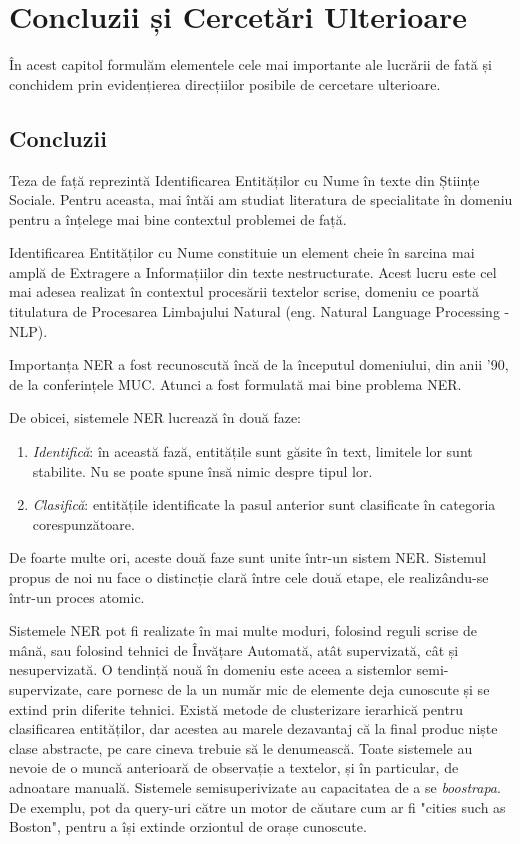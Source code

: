 \chapter{Concluzii și Cercetări Ulterioare}
\label{chapter:conclusions}

În acest capitol formulăm elementele cele mai importante ale lucrării de fată și conchidem prin evidențierea direcțiilor posibile de cercetare ulterioare.

\section{Concluzii}

Teza de față reprezintă Identificarea Entităților cu Nume în texte din Științe Sociale. Pentru aceasta, mai întăi am studiat literatura de specialitate în domeniu pentru a înțelege mai bine contextul problemei de față.


Identificarea Entităților cu Nume constituie un element cheie în sarcina mai amplă de Extragere a Informațiilor din texte nestructurate. Acest lucru este cel mai adesea realizat în contextul procesării textelor scrise, domeniu ce poartă titulatura de Procesarea Limbajului Natural (eng. Natural Language Processing - NLP).

Importanța NER a fost recunoscută încă de la începutul domeniului, din anii '90, de la conferințele MUC. Atunci a fost formulată mai bine problema NER.

De obicei, sistemele NER lucrează în două faze:

\begin{enumerate}

\item \textit{Identifică}: în această fază, entitățile sunt găsite în text, limitele lor sunt stabilite. Nu se poate spune însă nimic despre tipul lor.
\item \textit{Clasifică}: entitățile identificate la pasul anterior sunt clasificate în categoria corespunzătoare.

\end{enumerate}

De foarte multe ori, aceste două faze sunt unite într-un sistem NER. Sistemul propus de noi nu face o distincție clară între cele două etape, ele realizându-se într-un proces atomic.

Sistemele NER pot fi realizate în mai multe moduri, folosind reguli scrise de mână, sau folosind tehnici de Învățare Automată, atât supervizată, cât și nesupervizată. O tendință nouă în domeniu este aceea a sistemlor semi-supervizate, care pornesc de la un număr mic de elemente deja cunoscute și se extind prin diferite tehnici. Există metode de clusterizare ierarhică pentru clasificarea entităților, dar acestea au marele dezavantaj că la final produc niște clase abstracte, pe care cineva trebuie să le denumească. Toate sistemele au nevoie de o muncă anterioară de observație a textelor, și în particular, de adnoatare manuală. Sistemele semisuperivizate au capacitatea de a se \textit{boostrapa}. De exemplu, pot da query-uri către un motor de căutare cum ar fi "cities such as Boston", pentru a își extinde orziontul de orașe cunoscute.

